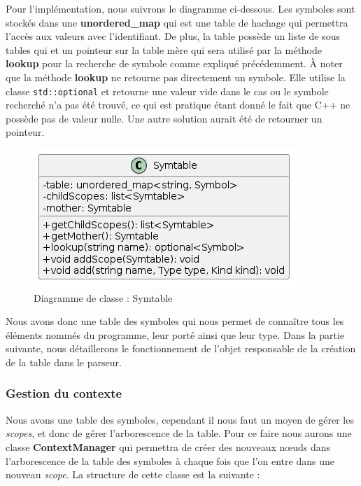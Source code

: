 \documentclass[a4paper]{article}%
\begin{document}
Pour l'implémentation, nous suivrons le diagramme ci-dessous. Les symboles sont
stockés dans une \textbf{unordered\_map} qui est une table de hachage qui
permettra l'accès aux valeurs avec l'identifiant. De plus, la table
possède un liste de sous tables qui et un pointeur sur la table mère qui sera
utilisé par la méthode \textbf{lookup} pour la recherche de symbole comme
expliqué précédemment. À noter que la méthode \textbf{lookup} ne retourne pas
directement un symbole. Elle utilise la classe \lstinline{std::optional} et
retourne une valeur vide dans le cas ou le symbole recherché n'a pas été trouvé,
ce qui est pratique étant donné le fait que C++ ne possède pas de valeur nulle.
Une autre solution aurait été de retourner un pointeur.

\begin{figure}[h!]
  \begin{center}
  \includegraphics[scale=0.5]{../ressources/diagrams/symtable2.png}
  \caption{Diagramme de classe : Symtable}
  \end{center}
\end{figure}

Nous avons donc une table des symboles qui nous permet de connaître tous les
éléments nommés du programme, leur porté ainsi que leur type. Dans la partie
suivante, nous détaillerons le fonctionnement de l'objet responsable de la
création de la table dans le parseur.

\clearpage
\subsubsection*{Gestion du contexte}

Nous avons une table des symboles, cependant il nous faut un moyen de gérer les
\textit{scopes}, et donc de gérer l'arborescence de la table. Pour ce faire nous
aurons une classe \textbf{ContextManager} qui permettra de créer des nouveaux
nœuds dans l'arborescence de la table des symboles à chaque fois que l'on entre
dans une nouveau \textit{scope}. La structure de cette classe est la suivante :
\end{document}
